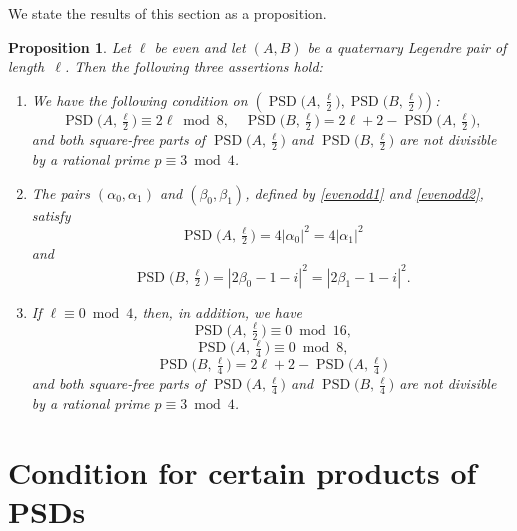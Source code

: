 \documentclass{article}
\newtheorem{proposition}{Proposition}
\theoremstyle{definition}
\newcommand{\PSD}{\operatorname{PSD}}
\begin{document}
We state the results of this section as a proposition.
\begin{proposition}
Let $\ell$ be even and let $(A,B)$ be a quaternary Legendre pair of length~$\ell$. Then the following three assertions hold:
\begin{enumerate}
\item We have the following condition on $\left(\PSD\bigl(A,\frac{\ell}{2}\bigr),\PSD\bigl(B,\frac{\ell}{2}\bigr)\right)$:  
$$\PSD\bigl(A,\tfrac{\ell}{2}\bigr)\equiv 2\ell \bmod 8, \quad \PSD\bigl(B,\tfrac{\ell}{2}\bigr)=2\ell+2-\PSD\bigl(A,\tfrac{\ell}{2}\bigr),$$
and both square-free parts of $\PSD\bigl(A,\frac{\ell}{2}\bigr)$ and $\PSD\bigl(B,\frac{\ell}{2}\bigr)$ are not divisible by a rational prime $p\equiv 3\bmod 4$. 

\item The pairs $(\alpha_0,\alpha_1)$ and $(\beta_0,\beta_1)$, defined by \eqref{evenodd1} and \eqref{evenodd2}, satisfy
$$\PSD\bigl(A,\tfrac{\ell}{2}\bigr)=4|\alpha_0|^2=4|\alpha_1|^2$$ 
and
$$\PSD\bigl(B,\tfrac{\ell}{2}\bigr)=|2\beta_0-1-i|^2=|2\beta_1-1-i|^2.$$

\item If $\ell\equiv 0\bmod 4$, then, in addition, we have\\
$$\PSD\bigl(A,\tfrac{\ell}{2}\bigr)\equiv 0 \bmod 16,$$
$$\PSD\bigl(A,\tfrac{\ell}{4}\bigr)\equiv 0\bmod 8,$$
$$\PSD\bigl(B,\tfrac{\ell}{4}\bigr)=2\ell+2-\PSD\bigl(A,\tfrac{\ell}{4}\bigr)$$
and both square-free parts of $\PSD\bigl(A,\frac{\ell}{4}\bigr)$ and $\PSD\bigl(B,\frac{\ell}{4}\bigr)$ are not divisible by a rational prime $p\equiv 3\bmod 4$.
\end{enumerate}
\end{proposition}

\section{Condition for certain products of PSDs}
\label{prod}
\end{document}
